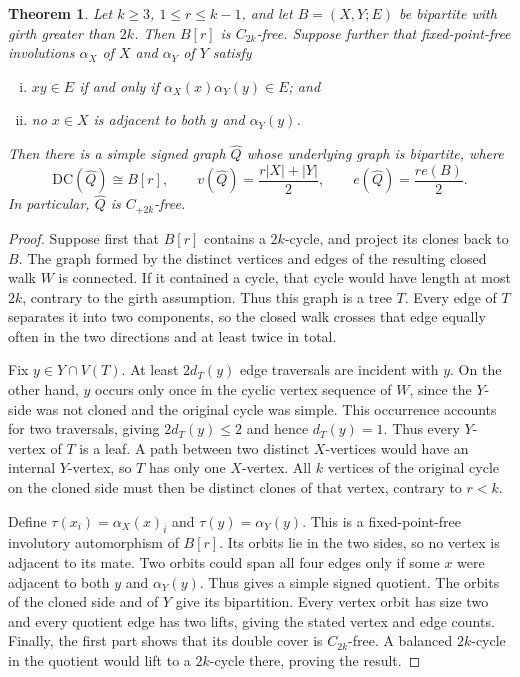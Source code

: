\documentclass{article}
\newcommand{\DC}{\mathrm{DC}}
\newtheorem{theorem}{Theorem}[section]
\theoremstyle{definition}
\theoremstyle{remark}
\begin{document}
\begin{theorem}\label{thm:equivariant-cloning}\label{lem:multicloning}
Let $k\geq3$, $1\leq r\leq k-1$, and let $B=(X,Y;E)$ be bipartite with
girth greater than $2k$.  Then $B[r]$ is $C_{2k}$-free.  Suppose further that
fixed-point-free involutions $\alpha_X$ of $X$ and $\alpha_Y$ of $Y$
satisfy
\begin{enumerate}[(i)]
\item $xy\in E$ if and only if $\alpha_X(x)\alpha_Y(y)\in E$; and
\item no $x\in X$ is adjacent to both $y$ and $\alpha_Y(y)$.
\end{enumerate}
Then there is a simple signed graph $\widehat Q$ whose underlying graph is bipartite,
where
\[
\DC(\widehat Q)\cong B[r],\qquad
v(\widehat Q)=\frac{r|X|+|Y|}{2},\qquad
e(\widehat Q)=\frac{r e(B)}2.
\]
In particular, $\widehat Q$ is $C_{+2k}$-free.
\end{theorem}
\begin{proof}
Suppose first that $B[r]$ contains a $2k$-cycle, and project its clones
back to $B$.  The graph formed by the distinct vertices and edges of the
resulting closed walk $W$ is connected.  If it contained a cycle, that
cycle would have length at most $2k$, contrary to the girth assumption.
Thus this graph is a tree $T$.  Every edge of $T$ separates it into two
components, so the closed walk crosses that edge equally often in the two
directions and at least twice in total.

Fix $y\in Y\cap V(T)$.  At least $2d_T(y)$ edge traversals are incident
with $y$.  On the other hand, $y$ occurs only once in the cyclic vertex
sequence of $W$, since the $Y$-side was not cloned and the original cycle
was simple.  This occurrence accounts for two traversals, giving
$2d_T(y)\leq2$ and hence $d_T(y)=1$.
Thus every $Y$-vertex of $T$ is a leaf.  A path between two distinct
$X$-vertices would have an internal $Y$-vertex, so $T$ has only one
$X$-vertex.  All $k$ vertices of the original cycle on the cloned side
must then be distinct clones of that vertex, contrary to $r<k$.

Define $\tau(x_i)=\alpha_X(x)_i$ and $\tau(y)=\alpha_Y(y)$.  This is a
fixed-point-free involutory automorphism of $B[r]$.  Its orbits lie in the
two sides, so no vertex is adjacent to its mate.  Two orbits could span
all four edges only if some $x$ were adjacent to both $y$ and
$\alpha_Y(y)$.  Thus  gives a simple
signed quotient.  The orbits of the cloned side and of $Y$ give its
bipartition.  Every vertex orbit has size two and every quotient edge has
two lifts, giving the stated vertex and edge counts.  Finally, the first
part shows that its double cover is $C_{2k}$-free.  A balanced $2k$-cycle
in the quotient would lift to a $2k$-cycle there, proving the result.
\end{proof}
\end{document}
